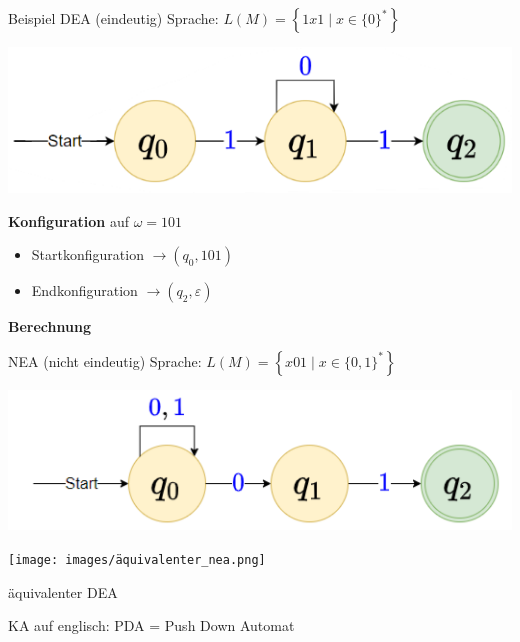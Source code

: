 



\begin{example2}{Beispiel DEA (eindeutig)} Sprache: $L(M)=\left\{1 x 1 \mid x \in\{0\}^{*}\right\}$
    
    \begin{minipage}{0.45\linewidth}
        \includegraphics[width=1\linewidth]{images/dea_example.png}
    \end{minipage}
    \hspace{1mm}
    \begin{minipage}{0.5\linewidth}
        \textbf{Konfiguration} auf $\omega=101$
        \begin{itemize}
        \item Startkonfiguration $\rightarrow\left(q_{0}, 101\right)$
        \item Endkonfiguration $\rightarrow\left(q_{2}, \varepsilon\right)$
        \end{itemize}
    \end{minipage}

    \textbf{Berechnung}


\end{example2}

\begin{example2}{NEA (nicht eindeutig)} Sprache: $L(M)=\left\{x 01 \mid x \in\{0,1\}^{*}\right\}$
    
    \begin{minipage}{0.55\linewidth}
        \includegraphics[width=1\linewidth]{images/nea_example1.png}
    \end{minipage}
    \hspace{1mm}
    \begin{minipage}{0.4\linewidth}
        \texttt{[image: images/äquivalenter\_nea.png]}
        
        äquivalenter DEA
    \end{minipage}    
\end{example2}

\begin{remark}
    KA auf englisch: PDA = Push Down Automat
\end{remark}